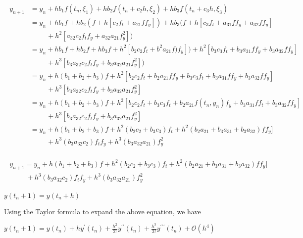 \documentclass[12pt,a4paper]{article}
\begin{document}
\begin{align*}
\begin{split}
y_{n+1} &= y_n + hb_1f(t_n,\xi_1) + hb_2f(t_n + c_2h,\xi_2) + hb_3f(t_n + c_3h,\xi_3) \\
&= y_n + hb_1f + hb_2(f + h[ c_2 f_t + a_{21}ff_y ]) + hb_3(f + h[ c_3 f_t + a_{31} ff_y + a_{32}ff_y ] \\
&\hspace{1cm} + h^2 [a_{32}c_2 f_t f_y + a_{32}a_{21}f_y^2]) \\
&= y_n + hb_1f + hb_2f + hb_3f + h^2 [ b_2c_2f_t + b^2a_{21}f)f_y ]) + h^2 [ b_3c_3 f_t + b_3a_{31} ff_y + b_3a_{32}ff_y ] \\
&\hspace{1cm}+ h^3 [b_3a_{32}c_2 f_tf_y + b_3a_{32}a_{21}f_y^2]) \\
&= y_n + h(b_1 + b_2 + b_3) f  + h^2 [ b_2c_2 f_t + b_2a_{21}ff_y +  b_3c_3 f_t + b_3a_{31} ff_y + b_3a_{32}f f_y] \\
&\hspace{1cm}+ h^3 [b_3a_{32}c_2 f_tf_y + b_3a_{32}a_{21} f_y^2] \\
&= y_n + h(b_1 + b_2 + b_3) f  + h^2 [ b_2c_2 f_t +  b_3c_3 f_t + b_2a_{21}f(t_n,y_n)f_y  + b_3a_{31} ff_t + b_3a_{32}f f_y ] \\
&\hspace{1cm}+ h^3 [b_3a_{32}c_2 f_t f_y+ b_3a_{32}a_{21} f_y^2] \\
&= y_n + h(b_1 + b_2 + b_3) f  + h^2( b_2c_2 + b_3c_3)f_t + h^2(b_2a_{21} + b_3a_{31} + b_3a_{32}) f f_y ] \\
&\hspace{1cm}+ h^3 (b_3a_{32}c_2) f_t f_y +h^3( b_3a_{32}a_{21})f_y^2
\end{split}
\end{align*}

\begin{align*}\label{1.3.1}
\begin{split}
y_{n+1}= y_n + h(b_1 + b_2 + b_3) f  + h^2( b_2c_2 + b_3c_3)f_t + h^2(b_2a_{21} + b_3a_{31} + b_3a_{32}) f f_y ] \\
\hspace{1cm} + h^3 (b_3a_{32}c_2) f_t f_y +h^3( b_3a_{32}a_{21})f_y^2
\end{split}
\end{align*}

$ y(t_n + 1) = y(t_n + h) $

Using the Taylor formula to expand the above equation, we have 

$ y(t_n + 1) = y(t_n)+ hy^\prime (t_n) + \frac{h^2}{2!}y^{\prime\prime} (t_n) + \frac{h^3}{3!}y^{\prime\prime\prime} (t_n)+ \mathcal{O}(h^4)  $
\end{document}
